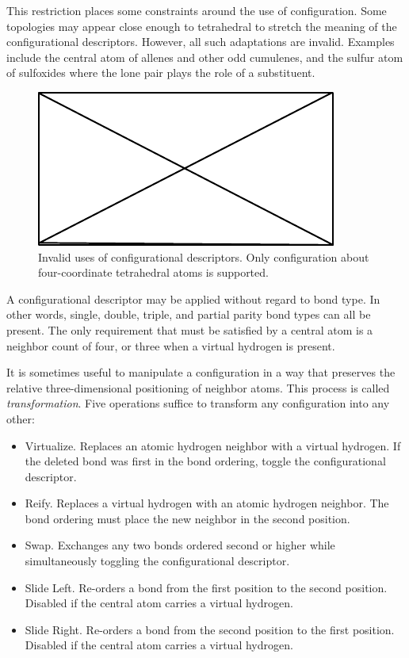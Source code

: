 \documentclass{article}
\begin{document}
This restriction places some constraints around the use of configuration. Some topologies may appear close enough to tetrahedral to stretch the meaning of the configurational descriptors. However, all such adaptations are invalid. Examples include the central atom of allenes and other odd cumulenes, and the sulfur atom of sulfoxides where the lone pair plays the role of a substituent.

\begin{figure}
    \centering
    \includegraphics{filler}
    \caption{Invalid uses of configurational descriptors. Only configuration about four-coordinate tetrahedral atoms is supported.}
    \label{fig:invalid-configurational-descriptors}
\end{figure}

A configurational descriptor may be applied without regard to bond type. In other words, single, double, triple, and partial parity bond types can all be present. The only requirement that must be satisfied by a central atom is a neighbor count of four, or three when a virtual hydrogen is present.

It is sometimes useful to manipulate a configuration in a way that preserves the relative three-dimensional positioning of neighbor atoms. This process is called \textit{transformation}. Five operations suffice to transform any configuration into any other:

\begin{itemize}
    \item{Virtualize. Replaces an atomic hydrogen neighbor with a virtual hydrogen. If the deleted bond was first in the bond ordering, toggle the configurational descriptor.}
    \item{Reify. Replaces a virtual hydrogen with an atomic hydrogen neighbor. The bond ordering must place the new neighbor in the second position.}
    \item{Swap. Exchanges any two bonds ordered second or higher while simultaneously toggling the configurational descriptor.}
    \item{Slide Left. Re-orders a bond from the first position to the second position. Disabled if the central atom carries a virtual hydrogen.}
    \item{Slide Right. Re-orders a bond from the second position to the first position. Disabled if the central atom carries a virtual hydrogen.}
\end{itemize}
\end{document}
